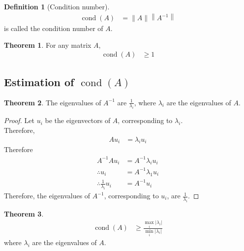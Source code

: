 \documentclass[fleqn, a4paper, 12pt, twoside, titlepage]{article}
\theoremstyle{definition}
\newtheorem{definition}{Definition}
\theoremstyle{theorem}
\newtheorem{theorem}{Theorem}
\DeclareMathOperator{\cond}{cond}
\begin{document}
\begin{definition}[Condition number]
	\begin{align*}
		\cond(A) &= \|A\| \left\| A^{-1} \right\|
	\end{align*}
	is called the condition number of $A$.
\end{definition}

\begin{theorem}
	For any matrix $A$,
	\begin{align*}
		\cond(A) &\ge 1
	\end{align*}
\end{theorem}

\subsection{Estimation of $\cond(A)$}

\begin{theorem}
	The eigenvalues of $A^{-1}$ are $\frac{1}{\lambda_i}$, where $\lambda_i$ are the eigenvalues of $A$.
\end{theorem}

\begin{proof}
	Let $u_i$ be the eigenvectors of $A$, corresponding to $\lambda_i$.\\
	Therefore,
	\begin{align*}
		A u_i &= \lambda_i u_i
	\end{align*}
	Therefore
	\begin{align*}
		A^{-1} A u_i &= A^{-1} \lambda_i u_i\\
		\therefore u_i &= A^{-1} \lambda_1 u_i\\
		\therefore \frac{1}{\lambda_i} u_i &= A^{-1} u_i
	\end{align*}
	Therefore, the eigenvalues of $A^{-1}$, corresponding to $u_i$, are $\frac{1}{\lambda_i}$.
\end{proof}

\begin{theorem}
	\begin{align*}
		\cond(A) &\ge \frac{\max\limits_{i} |\lambda_i|}{\min\limits_{i} |\lambda_i|}
	\end{align*}
	where $\lambda_i$ are the eigenvalues of $A$.
\end{theorem}
\end{document}
